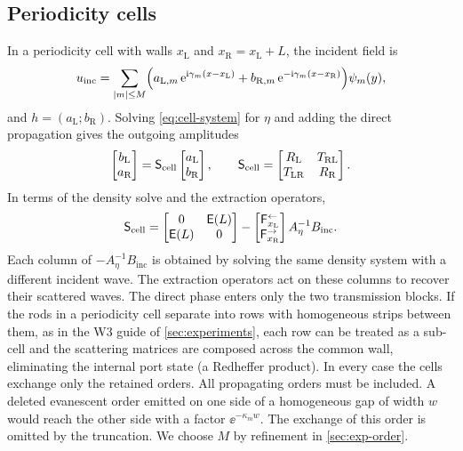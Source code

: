 \subsection{Periodicity cells}\label{sec:lead-cell}
In a periodicity cell with walls $x_{\mathrm L}$ and $x_{\mathrm R}=x_{\mathrm L}+L$,
the incident field is
\[
  u_{\mathrm{inc}}=\sum_{|m|\le M}\Bigl(a_{\mathrm L,m}\,\mathrm{e}^{\mathrm{i}\gamma_m(x-x_{\mathrm L})}
   +b_{\mathrm R,m}\,\mathrm{e}^{-\mathrm{i}\gamma_m(x-x_{\mathrm R})}\Bigr)\psi_m(y),
\]
and $h=(a_{\mathrm L};b_{\mathrm R})$. Solving \eqref{eq:cell-system} for
$\eta$ and adding the direct propagation gives the outgoing amplitudes
\begin{equation}\label{eq:smatrix}
 \begin{bmatrix}b_{\mathrm L}\\a_{\mathrm R}\end{bmatrix}
 =\mathsf S_{\rm cell}
 \begin{bmatrix}a_{\mathrm L}\\b_{\mathrm R}\end{bmatrix},\qquad
 \mathsf S_{\rm cell}=
 \begin{bmatrix}R_{\mathrm L}&T_{\mathrm{RL}}\\
 T_{\mathrm{LR}}&R_{\mathrm R}\end{bmatrix}.
\end{equation}
In terms of the density solve and the extraction operators,
\[
 \mathsf S_{\rm cell}=
 \begin{bmatrix}0&\mathsf E(L)\\ \mathsf E(L)&0\end{bmatrix}
 -\begin{bmatrix}\mathsf F^{\leftarrow}_{x_{\mathrm L}}\\
                  \mathsf F^{\rightarrow}_{x_{\mathrm R}}\end{bmatrix}
 A_\eta^{-1}B_{\mathrm{inc}} .
\]
Each column of $-A_\eta^{-1}B_{\mathrm{inc}}$ is obtained by solving the
same density system with a different incident wave. The extraction
operators act on these columns to recover their scattered waves.
The direct phase enters only the two transmission blocks. If the rods in a periodicity cell separate into rows with homogeneous
strips between them, as in the W3 guide of
\cref{sec:experiments}, each row can be treated as a sub-cell and the scattering
matrices are composed across the common wall, eliminating the internal port
state (a Redheffer product). In every case the cells exchange only the
retained orders. All propagating orders must be included. A deleted evanescent order
emitted on one side of a homogeneous gap of width $w$ would reach the
other side with a factor $\ee^{-\kappa_m w}$. The exchange of this order is
omitted by the truncation. We choose $M$ by refinement in
\cref{sec:exp-order}.


